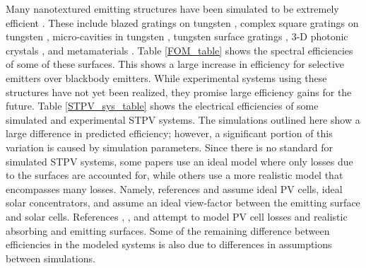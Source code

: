 \documentclass[review]{elsarticle}
\begin{document}
Many nanotextured emitting structures have been simulated to be extremely efficient \cite{paper2_ref13}.  These include blazed gratings on tungsten \cite{me2}, complex square gratings on tungsten \cite{paper2_ref14}, micro-cavities in tungsten \cite{paper2_ref6}, tungsten surface gratings \cite{paper1_ref6}, 3-D photonic crystals \cite{paper2_ref10}, and metamaterials \cite{meta}.  Table \ref{FOM_table} shows the spectral efficiencies of some of these surfaces.  This shows a large increase in efficiency for selective emitters over blackbody emitters.  While experimental systems using these structures have not yet been realized, they promise large efficiency gains for the future.  Table \ref{STPV_sys_table} shows the electrical efficiencies of some simulated and experimental STPV systems. 
The simulations outlined here show a large difference in predicted efficiency; however, a significant portion of this variation is caused by simulation parameters.  Since there is no standard for simulated STPV systems, some papers use an ideal model where only losses due to the surfaces are accounted for, while others use a more realistic model that encompasses many losses.  Namely, references \cite{RF_OptExp_2009} and \cite{global_opt} assume ideal PV cells, ideal solar concentrators, and assume an ideal view-factor between the emitting surface and solar cells.  References \cite{paper2_ref6}, \cite{me_thesis}, and \cite{NYL_SEMSC_2014} attempt to model PV cell losses and realistic absorbing and emitting surfaces.  Some of the remaining difference between efficiencies in the modeled systems is also due to differences in assumptions between simulations.
\end{document}
